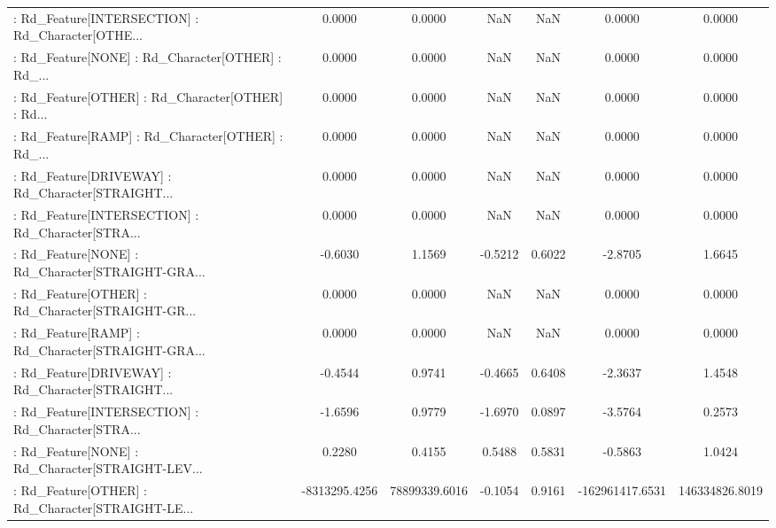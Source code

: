 \begin{longtable}{p{4cm}cccccc}
 : Rd\_Feature[INTERSECTION] : Rd\_Character[OTHE... &            0.0000 &            0.0000 &     NaN &          NaN &             0.0000 &            0.0000 \\
 : Rd\_Feature[NONE] : Rd\_Character[OTHER] : Rd\_... &            0.0000 &            0.0000 &     NaN &          NaN &             0.0000 &            0.0000 \\
 : Rd\_Feature[OTHER] : Rd\_Character[OTHER] : Rd... &            0.0000 &            0.0000 &     NaN &          NaN &             0.0000 &            0.0000 \\
 : Rd\_Feature[RAMP] : Rd\_Character[OTHER] : Rd\_... &            0.0000 &            0.0000 &     NaN &          NaN &             0.0000 &            0.0000 \\
 : Rd\_Feature[DRIVEWAY] : Rd\_Character[STRAIGHT... &            0.0000 &            0.0000 &     NaN &          NaN &             0.0000 &            0.0000 \\
 : Rd\_Feature[INTERSECTION] : Rd\_Character[STRA... &            0.0000 &            0.0000 &     NaN &          NaN &             0.0000 &            0.0000 \\
 : Rd\_Feature[NONE] : Rd\_Character[STRAIGHT-GRA... &           -0.6030 &            1.1569 & -0.5212 &       0.6022 &            -2.8705 &            1.6645 \\
 : Rd\_Feature[OTHER] : Rd\_Character[STRAIGHT-GR... &            0.0000 &            0.0000 &     NaN &          NaN &             0.0000 &            0.0000 \\
 : Rd\_Feature[RAMP] : Rd\_Character[STRAIGHT-GRA... &            0.0000 &            0.0000 &     NaN &          NaN &             0.0000 &            0.0000 \\
 : Rd\_Feature[DRIVEWAY] : Rd\_Character[STRAIGHT... &           -0.4544 &            0.9741 & -0.4665 &       0.6408 &            -2.3637 &            1.4548 \\
 : Rd\_Feature[INTERSECTION] : Rd\_Character[STRA... &           -1.6596 &            0.9779 & -1.6970 &       0.0897 &            -3.5764 &            0.2573 \\
 : Rd\_Feature[NONE] : Rd\_Character[STRAIGHT-LEV... &            0.2280 &            0.4155 &  0.5488 &       0.5831 &            -0.5863 &            1.0424 \\
 : Rd\_Feature[OTHER] : Rd\_Character[STRAIGHT-LE... &     -8313295.4256 &     78899339.6016 & -0.1054 &       0.9161 &    -162961417.6531 &    146334826.8019 \\

\end{longtable}
